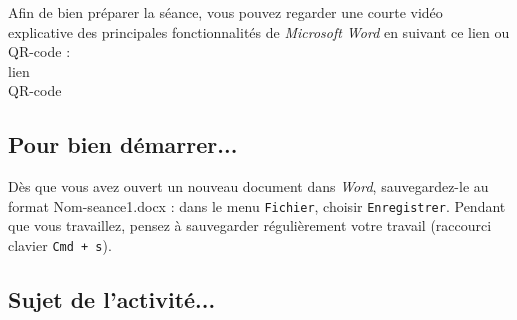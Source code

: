 Afin de bien préparer la séance, vous pouvez regarder une courte vidéo explicative des principales fonctionnalités de \emph{Microsoft Word} en suivant ce lien ou QR-code :\\

lien\\
QR-code


\subsection{Pour bien démarrer...}

Dès que vous avez ouvert un nouveau document dans \emph{Word}, sauvegardez-le au format Nom-seance1.docx : dans le menu \texttt{Fichier}, choisir \texttt{Enregistrer}. Pendant que vous travaillez, pensez à sauvegarder régulièrement votre travail (raccourci clavier \texttt{Cmd + s}).   


\subsection{Sujet de l'activité...}

\vspace{10pt}

